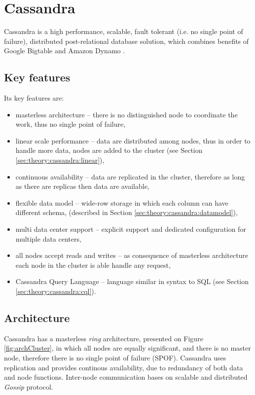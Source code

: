 
\section{Cassandra}
\label{sec:theory:cassandra}
Cassandra \cite{CassandraApacheDocs} \cite{CassandraDataStaxDocs} \cite{lakshman2010cassandra} is a high performance, scalable, fault tolerant (i.e. no single point of failure), distributed post-relational database solution, which combines benefits of Google Bigtable \cite{chang2008bigtable} and Amazon Dynamo \cite{decandia2007dynamo}.

\subsection{Key features}
Its key features are:
\begin{itemize}
\item masterless architecture -- there is no distinguished node to coordinate the work, thus no single point of failure,
\item linear scale performance -- data are distributed among nodes, thus in order to handle more data, nodes are added to the cluster (see Section \ref{sec:theory:cassandra:linear}),
\item continuous availability -- data are replicated in the cluster, therefore as long as there are replicas then data are available,
\item flexible data model -- wide-row storage in which each column can have different schema, (described in Section \ref{sec:theory:cassandra:datamodel}),
\item multi data center support -- explicit support and dedicated configuration for multiple data centers,
\item all nodes accept reads and writes -- as consequence of masterless architecture each node in the cluster is able handle any request, 
\item Cassandra Query Language -- language similar in syntax to SQL (see Section \ref{sec:theory:cassandra:cql}).
\end{itemize}

\subsection{Architecture}
Cassandra has a masterless \emph{ring} architecture, presented on Figure \ref{fig:archCluster}, in which all nodes are equally significant, and there is no master node, therefore there is no single point of failure (SPOF). Cassandra uses replication and provides continous availability, due to redundancy of both data and node functions.
Inter-node communication bases on scalable and distributed \emph{Gossip} protocol.


